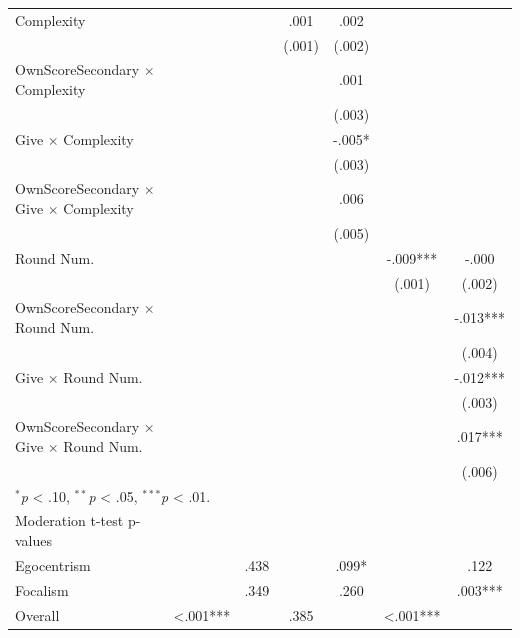 \begin{tabular*}{\linewidth}{@{\extracolsep{\fill}}lcccccc}
   Complexity &  &  & \mbox{\hphantom{8}.001\hphantom{888}} & \mbox{\hphantom{8}.002\hphantom{888}} &  & \\
    &  &  & \mbox{(.001)\hphantom{88}} & \mbox{(.002)\hphantom{88}} &  & \\
   OwnScoreSecondary $\times$ Complexity &  &  &  & \mbox{\hphantom{8}.001\hphantom{888}} &  & \\
    &  &  &  & \mbox{(.003)\hphantom{88}} &  & \\
   Give $\times$ Complexity &  &  &  & \mbox{-.005*\hphantom{88}} &  & \\
    &  &  &  & \mbox{(.003)\hphantom{88}} &  & \\
   OwnScoreSecondary $\times$ Give $\times$ Complexity &  &  &  & \mbox{\hphantom{8}.006\hphantom{888}} &  & \\
    &  &  &  & \mbox{(.005)\hphantom{88}} &  & \\
   Round Num. &  &  &  &  & \mbox{-.009***} & \mbox{-.000\hphantom{888}}\\
    &  &  &  &  & \mbox{(.001)\hphantom{88}} & \mbox{(.002)\hphantom{88}}\\
   OwnScoreSecondary $\times$ Round Num. &  &  &  &  &  & \mbox{-.013***}\\
    &  &  &  &  &  & \mbox{(.004)\hphantom{88}}\\
   Give $\times$ Round Num. &  &  &  &  &  & \mbox{-.012***}\\
    &  &  &  &  &  & \mbox{(.003)\hphantom{88}}\\
   OwnScoreSecondary $\times$ Give $\times$ Round Num. &  &  &  &  &  & \mbox{\hphantom{8}.017***}\\
    &  &  &  &  &  & \mbox{(.006)\hphantom{88}}\\
   \multicolumn{7}{l}{\scriptsize $^{*}$\textit{p} < .10, $^{**}$\textit{p} < .05, $^{***}$\textit{p} < .01.}\\
   \midrule
   Moderation t-test p-values &  &  &  &  &  & \\
   \hspace{1em}Egocentrism &  & \mbox{\hphantom{8}.438\hphantom{888}} &  & \mbox{\hphantom{8}.099*\hphantom{88}} &  & \mbox{\hphantom{8}.122\hphantom{888}}\\
   \hspace{1em}Focalism &  & \mbox{\hphantom{8}.349\hphantom{888}} &  & \mbox{\hphantom{8}.260\hphantom{888}} &  & \mbox{\hphantom{8}.003***}\\
   \hspace{1em}Overall & \mbox{<.001***} &  & \mbox{\hphantom{8}.385\hphantom{888}} &  & \mbox{<.001***} & \\
   \bottomrule
\end{tabular*}
\par\endgroup
